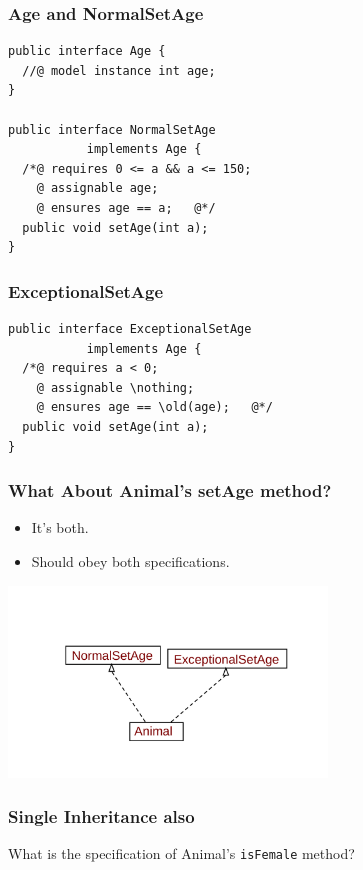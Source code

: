 \begin{frame}[fragile]
\frametitle{Age and NormalSetAge}
\begin{lstlisting}
public interface Age {
  //@ model instance int age;
}

public interface NormalSetAge 
           implements Age {
  /*@ requires 0 <= a && a <= 150;
    @ assignable age;
    @ ensures age == a;   @*/
  public void setAge(int a);
}
\end{lstlisting}
\end{frame}

\begin{frame}[fragile]
\frametitle{ExceptionalSetAge}
\begin{lstlisting}
public interface ExceptionalSetAge
           implements Age {
  /*@ requires a < 0;
    @ assignable \nothing;
    @ ensures age == \old(age);   @*/
  public void setAge(int a);
}
\end{lstlisting}
\end{frame}

\begin{frame}
\frametitle{What About Animal's setAge method?}

\begin{itemize}
\item
It's both.

\item
Should \alert{obey both specifications}.
\end{itemize}
\includegraphics[height=2in]{multiple-inh2}
\end{frame}

\begin{frame}[fragile]
\frametitle{Single Inheritance also}
\begin{question}
What is the specification of Animal's \texttt{isFemale} method?

\rm



\end{question}
\end{frame}

